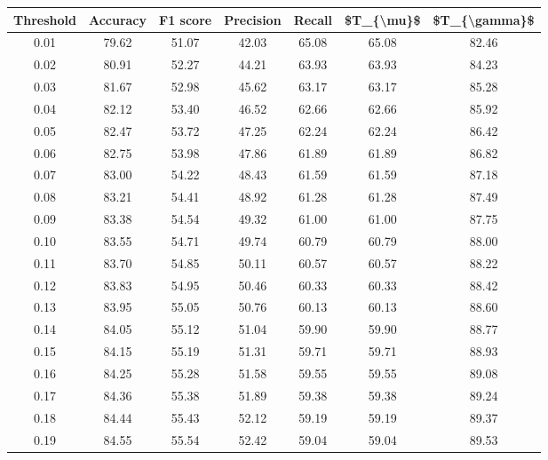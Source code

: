 \begin{tabular}{|c|c|c|c|c|c|c|}
\hline
 Threshold &  Accuracy &  F1 score &  Precision &  Recall &  \$T\_\{\textbackslash mu\}\$ &  \$T\_\{\textbackslash gamma\}\$ \\
\hline
      0.01 &     79.62 &     51.07 &      42.03 &   65.08 &      65.08 &         82.46 \\
      0.02 &     80.91 &     52.27 &      44.21 &   63.93 &      63.93 &         84.23 \\
      0.03 &     81.67 &     52.98 &      45.62 &   63.17 &      63.17 &         85.28 \\
      0.04 &     82.12 &     53.40 &      46.52 &   62.66 &      62.66 &         85.92 \\
      0.05 &     82.47 &     53.72 &      47.25 &   62.24 &      62.24 &         86.42 \\
      0.06 &     82.75 &     53.98 &      47.86 &   61.89 &      61.89 &         86.82 \\
      0.07 &     83.00 &     54.22 &      48.43 &   61.59 &      61.59 &         87.18 \\
      0.08 &     83.21 &     54.41 &      48.92 &   61.28 &      61.28 &         87.49 \\
      0.09 &     83.38 &     54.54 &      49.32 &   61.00 &      61.00 &         87.75 \\
      0.10 &     83.55 &     54.71 &      49.74 &   60.79 &      60.79 &         88.00 \\
      0.11 &     83.70 &     54.85 &      50.11 &   60.57 &      60.57 &         88.22 \\
      0.12 &     83.83 &     54.95 &      50.46 &   60.33 &      60.33 &         88.42 \\
      0.13 &     83.95 &     55.05 &      50.76 &   60.13 &      60.13 &         88.60 \\
      0.14 &     84.05 &     55.12 &      51.04 &   59.90 &      59.90 &         88.77 \\
      0.15 &     84.15 &     55.19 &      51.31 &   59.71 &      59.71 &         88.93 \\
      0.16 &     84.25 &     55.28 &      51.58 &   59.55 &      59.55 &         89.08 \\
      0.17 &     84.36 &     55.38 &      51.89 &   59.38 &      59.38 &         89.24 \\
      0.18 &     84.44 &     55.43 &      52.12 &   59.19 &      59.19 &         89.37 \\
      0.19 &     84.55 &     55.54 &      52.42 &   59.04 &      59.04 &         89.53 \\

\end{tabular}
